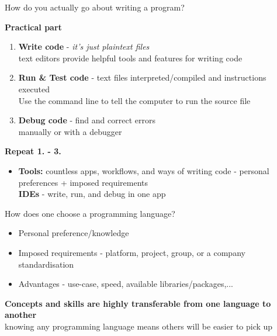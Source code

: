 \documentclass[aspectratio=169,hyperref={unicode}]{beamer}
\begin{document}
\begin{frame}{How do you actually go about writing a program?}

\begin{center}
	\Large\textbf{Practical part}
\end{center}
\begin{enumerate}
	\item \textbf{Write code} - \textit{it's just plaintext files}\\ text editors provide helpful tools and features for writing code
	\item \textbf{Run \& Test code} - text files interpreted/compiled and instructions executed\\ Use the command line to tell the computer to run the source file	\item \textbf{Debug code} - find and correct errors\\ manually or with a debugger
 
\end{enumerate}
\textbf{Repeat 1. - 3.}

\begin{itemize}
	\item \textbf{Tools:} countless apps, workflows, and ways of writing code - personal preferences + imposed requirements\\
	\textbf{IDEs} - write, run, and debug in one app
\end{itemize}

\end{frame}
\begin{frame}{How does one choose a programming language?}
\begin{itemize}
	\item Personal preference/knowledge
	\item Imposed requirements - platform, project, group, or a company standardisation
	\item Advantages - use-case, speed, available libraries/packages,... 
\end{itemize}

\begin{center}\textbf{Concepts and skills are highly transferable from one language to another}\\ knowing any programming language means others will be easier to pick up\end{center}

\end{frame}
\end{document}
